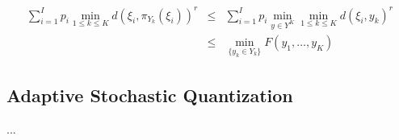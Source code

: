 \begin{eqnarray}
    \label{sq-branch-bound:eq}
        \sum_{i=1}^I p_i \min_{1 \leq k \leq K} d(\xi_i, \pi_{Y_k} (\xi_i))^r
        &\leq& \sum_{i=1}^I p_i \min_{y \in Y^K} \min_{1 \leq k \leq K} d(\xi_i, y_k)^r \nonumber \\
        &\leq& \min_{\{ y_k \in Y_k \}} F(y_1, \ldots, y_K)
\end{eqnarray}

\subsection{Adaptive Stochastic Quantization}

...

